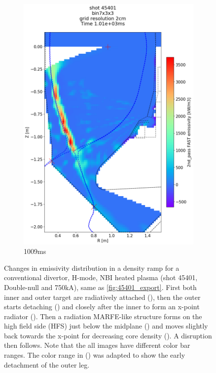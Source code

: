 \begin{figure}
\begin{subfigure}{0.395\linewidth}
         \includegraphics[trim={75 95 0 195},clip,width=\textwidth]{Chapters/chapter2/figs/IRVB-MASTU_shot-45401_export_90.png}
         \vspace*{-6.5mm}
         \caption{1009ms}
         \label{fig:45401_export2_5}
     \end{subfigure}
    \vspace*{-3mm}
    \caption{Changes in emissivity distribution in a density ramp for a conventional divertor, H-mode, NBI heated plasma (shot 45401, Double-null and 750kA), same as \autoref{fig:45401_export}. First both inner and outer target are radiatively attached (), then the outer starts detaching () and closely after the inner to form an x-point radiator (). Then a radiation MARFE-like structure forms on the high field side (HFS) just below the midplane () and moves slightly back towards the x-point for decreasing core density (). A disruption then follows. Note that the all images have different color bar ranges. The color range in () was adapted to show the early detachment of the outer leg.}
    \label{fig:45401_export2}
\end{figure}

